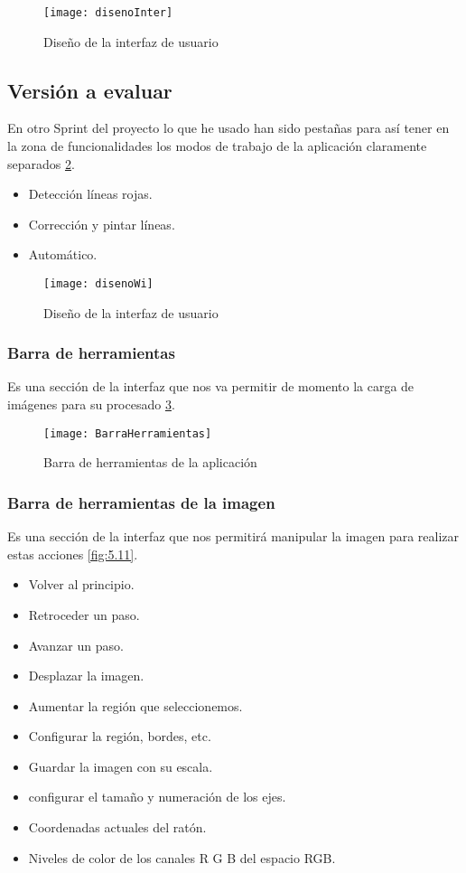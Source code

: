 \begin{figure}[h]
\centering
\texttt{[image: disenoInter]}
\caption{Diseño de la interfaz de usuario}
\label{fig:5.8}
\end{figure}

\subsection{Versión a evaluar}

En otro Sprint del proyecto lo que he usado han sido pestañas para así tener en la zona de funcionalidades los modos de trabajo de la aplicación claramente separados \ref{fig:5.9}.

\begin{itemize}
\item Detección líneas rojas.
\item Corrección y pintar líneas.
\item Automático.
\end{itemize}


\begin{figure}[h]
\centering
\texttt{[image: disenoWi]}
\caption{Diseño de la interfaz de usuario}
\label{fig:5.9}
\end{figure}
\subsubsection{Barra de herramientas}
Es una sección de la interfaz que nos va permitir de momento la carga de imágenes para su procesado \ref{fig:5.10}.
\begin{figure}[h]
\centering
\texttt{[image: BarraHerramientas]}
\caption{Barra de herramientas de la aplicación}
\label{fig:5.10}
\end{figure}

\subsubsection{Barra de herramientas de la imagen}
Es una sección de la interfaz que nos permitirá manipular la imagen para realizar estas acciones \ref{fig:5.11}.

\begin{itemize}
\item Volver al principio. 
\item Retroceder un paso.
\item Avanzar un paso.
\item Desplazar la imagen.
\item Aumentar la región que seleccionemos.
\item Configurar la región, bordes, etc.
\item Guardar la imagen con su escala.
\item configurar el tamaño y numeración de los ejes.
\item Coordenadas actuales del ratón.
\item Niveles de color de los canales R G B del espacio RGB.
\end{itemize}

